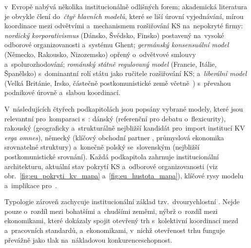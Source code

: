 
 v~Evropě nabývá několika institucionálně odlišných forem; akademická
literatura je obvykle člení do~\emph{čtyř hlavních modelů}, které se liší úrovní
vyjednávání, mírou koordinace mezi odvětvími a~mechanismem rozšiřování \acs{KS}
na~nepokryté firmy:
\emph{nordický korporativismus} (Dánsko, Švédsko, Finsko) postavený na~vysoké
odborové organizovanosti a~systému Ghent; \emph{germánský konsensuální model} (Německo,
Rakousko, Nizozemsko) opřený o~odvětvové smlouvy a~spolurozhodování; \emph{románský
státně regulovaný model} (Francie, Itálie, Španělsko) s~dominantní rolí státu
jako ručitele rozšiřování \acs{KS}; a~\emph{liberální model} (Velká Británie, Irsko,
částečně postkomunistické země včetně~) s~převahou podnikové úrovně
a~slabou koordinací.~\cite{Hala_SystemySocialnihoDialogu2013}

V~následujících čtyřech podkapitolách jsou popsány vybrané modely, které jsou
relevantní pro~komparaci s~: dánský (referenční pro debatu o~flexicurity),
rakouský (geograficky a~strukturálně nejbližší kandidát pro~import institucí
\acs{KV} \textit{erga omnes}), německý (klíčový obchodní partner ,
průmyslová ekonomika srovnatelné struktury) a~konečně polský se~slovenským
(nejbližší postkomunistické srovnání). Každá podkapitola zahrnuje
institucionální architekturu, aktuální stav pokrytí \acs{KS} a~odborové organizovanosti
(viz obr.~\ref{fig:eu_pokryti_kv_mapa} a~\ref{fig:eu_hustota_mapa}), klíčové
rysy modelu a~implikace pro~.

Typologie zároveň zachycuje institucionální základ tzv.~dvourychlostní . Nejde pouze o~rozdíl mezi bohatšími a~chudšími zeměmi, nýbrž o~rozdíl mezi ekonomikami, které dokázaly spojit otevřený trh s~kolektivní koordinací mezd a~pracovních standardů, a~ekonomikami, v~nichž otevřenost trhu funguje převážně jako tlak na~nákladovou konkurenceschopnost.\cite{EC_WhitePaper_FutureOfEurope_2017}~\cite{Brixova_MICT_CEE_2026}\par
